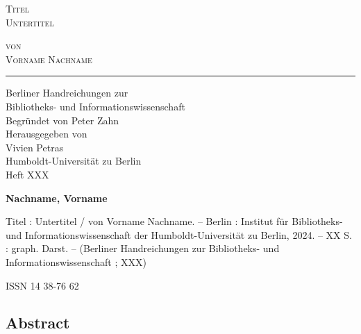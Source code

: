 \documentclass[paper=a4,11pt,twoside,parskip=half-]{scrreprt} %
\begin{document}
\clearpage{\thispagestyle{empty}\cleardoublepage}
\clearpage{\thispagestyle{empty}\cleardoublepage}
\centering
\phantom{x}
\vspace{5cm}

{\Large \scshape Titel \\ Untertitel\par}

\vspace{4cm}

{\Large \scshape von \\ Vorname Nachname \par}

\vspace{3cm}
\hrule
\vspace{1cm}
\raggedleft
{\Large Berliner Handreichungen zur \\
Bibliotheks- und Informationswissenschaft \\
\vspace{1cm}
Begründet von Peter Zahn \\
Herausgegeben von \\
Vivien Petras \\
Humboldt-Universität zu Berlin \\
\vspace{.5cm}
Heft XXX} %

\newpage
\thispagestyle{empty}
\justifying
\phantom{x}
\vspace{.5cm}

{ \large \textbf{Nachname, Vorname} \par

 Titel : Untertitel
/ von Vorname Nachname. -- Berlin : Institut für Bibliotheks- und Informationswissenschaft
der Humboldt-Universität zu Berlin, 2024. -- XX S. : graph. Darst. -- (Berliner Handreichungen zur Bibliotheks- und Informationswissenschaft
; XXX) \par %

 ISSN 14 38-76 62 \par} %


\subsection*{\textrm{\foreignlanguage{english}{Abstract}}}
\blindtext 
\blindtext \par
\end{document}
